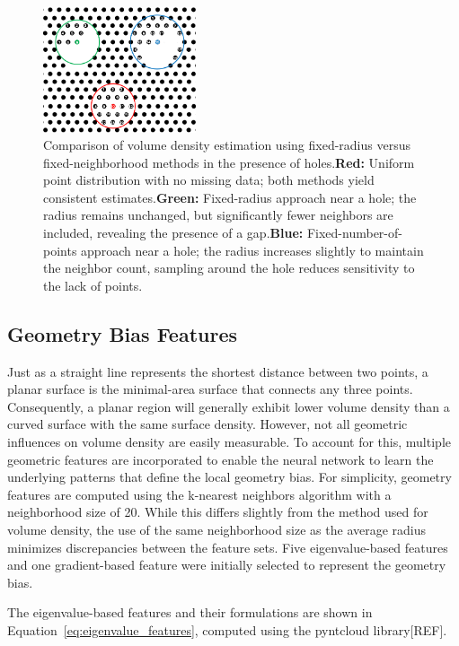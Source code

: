 \begin{figure}[H]
    \centering
    \includegraphics[width=0.4\textwidth]{figures/RadiusVSPoint_based.png}
    \caption{Comparison of volume density estimation using fixed-radius versus fixed-neighborhood methods in the presence of holes.\textbf{Red:} Uniform point distribution with no missing data; both methods yield consistent estimates.\textbf{Green:} Fixed-radius approach near a hole; the radius remains unchanged, but significantly fewer neighbors are included, revealing the presence of a gap.\textbf{Blue:} Fixed-number-of-points approach near a hole; the radius increases slightly to maintain the neighbor count, sampling around the hole reduces sensitivity to the lack of points.}\label{fig:radVSnbh_VD}
\end{figure}

\subsection*{Geometry Bias Features}
Just as a straight line represents the shortest distance between two points, a planar surface is the minimal-area surface that connects any three points. Consequently, a planar region will generally exhibit lower volume density than a curved surface with the same surface density. However, not all geometric influences on volume density are easily measurable. To account for this, multiple geometric features are incorporated to enable the neural network to learn the underlying patterns that define the local geometry bias.
For simplicity, geometry features are computed using the k-nearest neighbors algorithm with a neighborhood size of 20. While this differs slightly from the method used for volume density, the use of the same neighborhood size as the average radius minimizes discrepancies between the feature sets. Five eigenvalue-based features and one gradient-based feature were initially selected to represent the geometry bias. 

The eigenvalue-based features and their formulations are shown in Equation~\ref{eq:eigenvalue_features}, computed using the pyntcloud library[REF]. 

